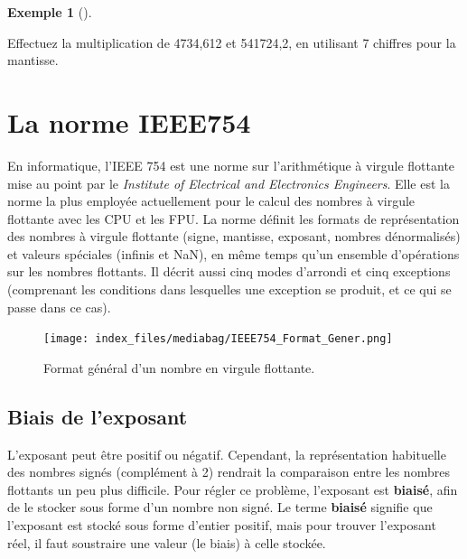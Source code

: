 \documentclass[
  letterpaper,
]{scrbook}
\theoremstyle{plain}
\theoremstyle{definition}
\theoremstyle{definition}
\newtheorem{example}{Exemple}[chapter]
\theoremstyle{remark}
\begin{document}
\begin{example}[]\protect\hypertarget{exm-multiplication-virgule-flottante}{}\label{exm-multiplication-virgule-flottante}

Effectuez la multiplication de 4734,612 et 541724,2, en utilisant 7
chiffres pour la mantisse.

\end{example}

\hypertarget{sec-ieee754}{%
\section{La norme IEEE754}\label{sec-ieee754}}

En informatique, l'IEEE 754 est une norme sur l'arithmétique à virgule
flottante mise au point par le \emph{Institute of Electrical and
Electronics Engineers}. Elle est la norme la plus employée actuellement
pour le calcul des nombres à virgule flottante avec les CPU et les FPU.
La norme définit les formats de représentation des nombres à virgule
flottante (signe, mantisse, exposant, nombres dénormalisés) et valeurs
spéciales (infinis et NaN), en même temps qu'un ensemble d'opérations
sur les nombres flottants. Il décrit aussi cinq modes d'arrondi et cinq
exceptions (comprenant les conditions dans lesquelles une exception se
produit, et ce qui se passe dans ce cas).

\begin{figure}

{\centering \texttt{[image: index\_files/mediabag/IEEE754\_Format\_Gener.png]}

}

\caption{Format général d'un nombre en virgule flottante.}

\end{figure}

\hypertarget{biais-de-lexposant}{%
\subsection*{Biais de l'exposant}\label{biais-de-lexposant}}

L'exposant peut être positif ou négatif. Cependant, la représentation
habituelle des nombres signés (complément à 2) rendrait la comparaison
entre les nombres flottants un peu plus difficile. Pour régler ce
problème, l'exposant est \textbf{biaisé}, afin de le stocker sous forme
d'un nombre non signé. Le terme \textbf{biaisé} signifie que l'exposant
est stocké sous forme d'entier positif, mais pour trouver l'exposant
réel, il faut soustraire une valeur (le biais) à celle stockée.
\end{document}
